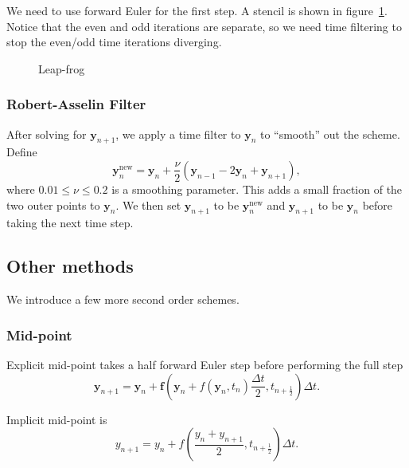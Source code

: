 \documentclass[11pt, a4paper]{article}
\theoremstyle{break}
\newcommand*{\Paren}[1]{\left(#1\right)}%
\newcommand{\ve}{\mathbf} %
\newcommand{\dt}{\Delta t}
\begin{document}
We need to use forward Euler for the first step. A stencil is shown in figure~\ref{fig:leapFrog}. Notice that the even and odd iterations are separate, so we need time filtering to stop the even/odd time iterations diverging.



\begin{figure}\centering
	
	\caption{Leap-frog}\label{fig:leapFrog}
\end{figure}

\subsubsection{Robert-Asselin Filter}
After solving for $\ve y_{n+1}$, we apply a time filter to $\ve y_n$ to ``smooth'' out the scheme. Define \[\ve y_n^{\text{new}}=\ve y_n+\frac\nu2(\ve y_{n-1}-2\ve y_n+\ve y_{n+1}),\] where $0.01\leq \nu\leq 0.2$ is a smoothing parameter. This adds a small fraction of the two outer points to $\ve y_n$. We then set $\ve y_{n+1}$ to be $\ve y_n^\text{new}$ and $\ve y_{n+1}$ to be $\ve y_n$ before taking the next time step.

\subsection{Other methods}
We introduce a few more second order schemes.
\subsubsection{Mid-point}
Explicit mid-point takes a half forward Euler step before performing the full step
\[\ve y_{n+1}=\ve y_n + \ve f\Paren{\ve y_n+f(\ve y_n,t_n)\frac{\dt}2,t_{n+\frac12}}\dt.\]

Implicit mid-point is \[y_{n+1}	=y_n+f\Paren{\frac{y_n+y_{n+1}}{2},t_{n+\frac12}}\dt.\]
\end{document}
